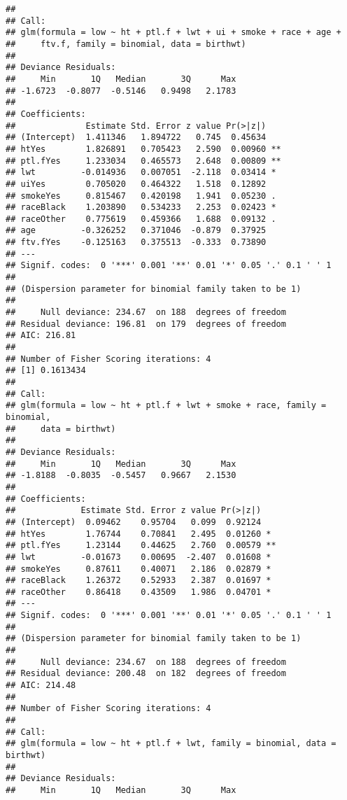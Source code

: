 \documentclass{article}\usepackage[]{graphicx}\usepackage[]{color}
\makeatletter
\newenvironment{kframe}{%
 \def\at@end@of@kframe{}%
 \ifinner\ifhmode%
  \def\at@end@of@kframe{\end{minipage}}%
  \begin{minipage}{\columnwidth}%
 \fi\fi%
 \def\FrameCommand##1{\hskip\@totalleftmargin \hskip-\fboxsep
 \colorbox{shadecolor}{##1}\hskip-\fboxsep
     \hskip-\linewidth \hskip-\@totalleftmargin \hskip\columnwidth}%
 \MakeFramed {\advance\hsize-\width
   \@totalleftmargin\z@ \linewidth\hsize
   \@setminipage}}%
 {\par\unskip\endMakeFramed%
 \at@end@of@kframe}
\newenvironment{knitrout}{}{} %
\makeatother
\begin{document}
\begin{knitrout}
\color{fgcolor}\begin{kframe}
\begin{verbatim}
## 
## Call:
## glm(formula = low ~ ht + ptl.f + lwt + ui + smoke + race + age + 
##     ftv.f, family = binomial, data = birthwt)
## 
## Deviance Residuals: 
##     Min       1Q   Median       3Q      Max  
## -1.6723  -0.8077  -0.5146   0.9498   2.1783  
## 
## Coefficients:
##              Estimate Std. Error z value Pr(>|z|)   
## (Intercept)  1.411346   1.894722   0.745  0.45634   
## htYes        1.826891   0.705423   2.590  0.00960 **
## ptl.fYes     1.233034   0.465573   2.648  0.00809 **
## lwt         -0.014936   0.007051  -2.118  0.03414 * 
## uiYes        0.705020   0.464322   1.518  0.12892   
## smokeYes     0.815467   0.420198   1.941  0.05230 . 
## raceBlack    1.203890   0.534233   2.253  0.02423 * 
## raceOther    0.775619   0.459366   1.688  0.09132 . 
## age         -0.326252   0.371046  -0.879  0.37925   
## ftv.fYes    -0.125163   0.375513  -0.333  0.73890   
## ---
## Signif. codes:  0 '***' 0.001 '**' 0.01 '*' 0.05 '.' 0.1 ' ' 1
## 
## (Dispersion parameter for binomial family taken to be 1)
## 
##     Null deviance: 234.67  on 188  degrees of freedom
## Residual deviance: 196.81  on 179  degrees of freedom
## AIC: 216.81
## 
## Number of Fisher Scoring iterations: 4
## [1] 0.1613434
## 
## Call:
## glm(formula = low ~ ht + ptl.f + lwt + smoke + race, family = binomial, 
##     data = birthwt)
## 
## Deviance Residuals: 
##     Min       1Q   Median       3Q      Max  
## -1.8188  -0.8035  -0.5457   0.9667   2.1530  
## 
## Coefficients:
##             Estimate Std. Error z value Pr(>|z|)   
## (Intercept)  0.09462    0.95704   0.099  0.92124   
## htYes        1.76744    0.70841   2.495  0.01260 * 
## ptl.fYes     1.23144    0.44625   2.760  0.00579 **
## lwt         -0.01673    0.00695  -2.407  0.01608 * 
## smokeYes     0.87611    0.40071   2.186  0.02879 * 
## raceBlack    1.26372    0.52933   2.387  0.01697 * 
## raceOther    0.86418    0.43509   1.986  0.04701 * 
## ---
## Signif. codes:  0 '***' 0.001 '**' 0.01 '*' 0.05 '.' 0.1 ' ' 1
## 
## (Dispersion parameter for binomial family taken to be 1)
## 
##     Null deviance: 234.67  on 188  degrees of freedom
## Residual deviance: 200.48  on 182  degrees of freedom
## AIC: 214.48
## 
## Number of Fisher Scoring iterations: 4
## 
## Call:
## glm(formula = low ~ ht + ptl.f + lwt, family = binomial, data = birthwt)
## 
## Deviance Residuals: 
##     Min       1Q   Median       3Q      Max  

\end{verbatim}
\end{kframe}
\end{knitrout}
\end{document}
